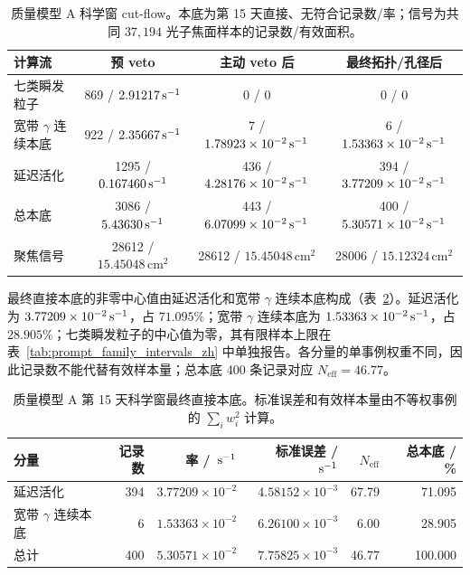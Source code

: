 \begin{table}[H]
\centering
\caption{质量模型 A 科学窗 cut-flow。本底为第 15 天直接、无符合记录数/率；信号为共同 $37{,}194$ 光子焦面样本的记录数/有效面积。}
\label{tab:phase2_cutflow}
\footnotesize
\begin{tabular}{lccc}
\toprule
计算流 & 预 veto & 主动 veto 后 & 最终拓扑/孔径后 \\
\midrule
七类瞬发粒子 & 869 / $2.91217\,\mathrm{s^{-1}}$ & 0 / 0 & 0 / 0 \\
宽带 $\gamma$ 连续本底 & 922 / $2.35667\,\mathrm{s^{-1}}$ & 7 / $1.78923\times10^{-2}\,\mathrm{s^{-1}}$ & 6 / $1.53363\times10^{-2}\,\mathrm{s^{-1}}$ \\
延迟活化 & 1295 / $0.167460\,\mathrm{s^{-1}}$ & 436 / $4.28176\times10^{-2}\,\mathrm{s^{-1}}$ & 394 / $3.77209\times10^{-2}\,\mathrm{s^{-1}}$ \\
总本底 & 3086 / $5.43630\,\mathrm{s^{-1}}$ & 443 / $6.07099\times10^{-2}\,\mathrm{s^{-1}}$ & 400 / $5.30571\times10^{-2}\,\mathrm{s^{-1}}$ \\
聚焦信号 & 28612 / $15.45048\,\mathrm{cm^2}$ & 28612 / $15.45048\,\mathrm{cm^2}$ & 28006 / $15.12324\,\mathrm{cm^2}$ \\
\bottomrule
\end{tabular}
\end{table}

最终直接本底的非零中心值由延迟活化和宽带 $\gamma$ 连续本底构成（表~\ref{tab:reference_background_budget_zh}）。延迟活化为 $3.77209\times10^{-2}\,\mathrm{s^{-1}}$，占 $71.095\%$；宽带 $\gamma$ 连续本底为 $1.53363\times10^{-2}\,\mathrm{s^{-1}}$，占 $28.905\%$；七类瞬发粒子的中心值为零，其有限样本上限在表~\ref{tab:prompt_family_intervals_zh} 中单独报告。各分量的单事例权重不同，因此记录数不能代替有效样本量；总本底 400 条记录对应 $N_{\mathrm{eff}}=46.77$。

\begin{table}[H]
\centering
\caption{质量模型 A 第 15 天科学窗最终直接本底。标准误差和有效样本量由不等权事例的 $\sum_i w_i^2$ 计算。}
\label{tab:reference_background_budget_zh}
\footnotesize
\begin{tabular}{lrrrrr}
\toprule
分量 & 记录数 & 率 / $\,\mathrm{s^{-1}}$ & 标准误差 / $\,\mathrm{s^{-1}}$ & $N_{\mathrm{eff}}$ & 总本底 / \% \\
\midrule
延迟活化 & 394 & $3.77209\times10^{-2}$ & $4.58152\times10^{-3}$ & 67.79 & 71.095 \\
宽带 $\gamma$ 连续本底 & 6 & $1.53363\times10^{-2}$ & $6.26100\times10^{-3}$ & 6.00 & 28.905 \\
\midrule
总计 & 400 & $5.30571\times10^{-2}$ & $7.75825\times10^{-3}$ & 46.77 & 100.000 \\
\bottomrule
\end{tabular}
\end{table}

